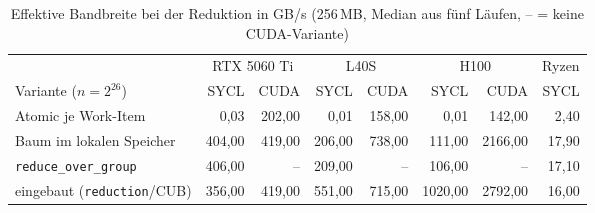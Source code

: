 \documentclass[12pt,a4paper]{article}
\begin{document}
\begin{table}[H]
\centering
\footnotesize
\setlength{\tabcolsep}{4pt}
\caption[Effektive Bandbreite bei der Reduktion (GB/s)]{Effektive Bandbreite bei der Reduktion in GB/s (256\,MB, Median aus fünf Läufen, -- = keine CUDA-Variante)}
\label{tab:reduktion}
\begin{tabular}{@{}l*{7}{r}@{}}
\toprule
 & \multicolumn{2}{c}{RTX 5060 Ti} & \multicolumn{2}{c}{L40S} & \multicolumn{2}{c}{H100} & Ryzen \\
\cmidrule(lr){2-3}\cmidrule(lr){4-5}\cmidrule(lr){6-7}\cmidrule(l){8-8}
Variante ($n = 2^{26}$) & SYCL & CUDA & SYCL & CUDA & SYCL & CUDA & SYCL \\
\midrule
Atomic je Work-Item                  &   0,03 &  202,00 &   0,01 &  158,00 &    0,01 &  142,00 &  2,40 \\
Baum im lokalen Speicher             & 404,00 &  419,00 & 206,00 &  738,00 &  111,00 & 2166,00 & 17,90 \\
\texttt{reduce\_over\_group}         & 406,00 &      -- & 209,00 &      -- &  106,00 &      -- & 17,10 \\
eingebaut (\texttt{reduction}/CUB)   & 356,00 &  419,00 & 551,00 &  715,00 & 1020,00 & 2792,00 & 16,00 \\
\bottomrule
\end{tabular}
\end{table}
\end{document}
